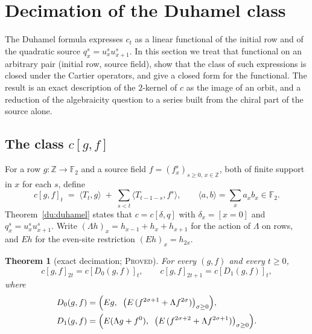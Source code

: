 \documentclass[11pt]{article}
\newtheorem{theorem}{Theorem}[section]
\theoremstyle{definition}
\theoremstyle{remark}
\newcommand{\PROVED}{\textsc{Proved}}
\begin{document}
\section{Decimation of the Duhamel class}\label{du:decimation}

The Duhamel formula expresses $c_t$ as a linear functional of the initial row
and of the quadratic source $q^s_x = u^s_x u^s_{x+1}$. In this section we treat
that functional on an arbitrary pair (initial row, source field), show that the
class of such expressions is closed under the Cartier operators, and give a
closed form for the functional. The result is an exact description of the
$2$-kernel of $c$ as the image of an orbit, and a reduction of the algebraicity
question to a series built from the chiral part of the source alone.

\subsection{The class $c[g,f]$}

For a row $g\colon \mathbb Z\to\mathbb F_2$ and a source field
$f=(f^s_x)_{s\ge 0,\,x\in\mathbb Z}$, both of finite support in $x$ for each $s$,
define
\[
  c[g,f]_t \;=\; \langle T_t, g\rangle \;+\; \sum_{s<t}\langle T_{t-1-s}, f^s\rangle,
  \qquad \langle a,b\rangle=\sum_{x} a_x b_x \in \mathbb F_2 .
\]
Theorem~\ref{du:duhamel} states that $c = c[\delta, q]$ with $\delta_x=[x=0]$ and
$q^s_x=u^s_x u^s_{x+1}$. Write $(\Lambda h)_x = h_{x-1}+h_x+h_{x+1}$ for the
action of $\Lambda$ on rows, and $E h$ for the even-site restriction
$(Eh)_x = h_{2x}$.

\begin{theorem}[exact decimation; \PROVED]\label{du:thm:A}
For every $(g,f)$ and every $t\ge 0$,
\[
  c[g,f]_{2t} = c[D_0(g,f)]_t, \qquad c[g,f]_{2t+1} = c[D_1(g,f)]_t ,
\]
where
\begin{align*}
  D_0(g,f) &= \Bigl(E g,\;\; \bigl(E\,(f^{2\sigma+1} + \Lambda f^{2\sigma})\bigr)_{\sigma\ge 0}\Bigr),\\
  D_1(g,f) &= \Bigl(E(\Lambda g + f^{0}),\;\; \bigl(E\,(f^{2\sigma+2} + \Lambda f^{2\sigma+1})\bigr)_{\sigma\ge 0}\Bigr).
\end{align*}
\end{theorem}
\end{document}
